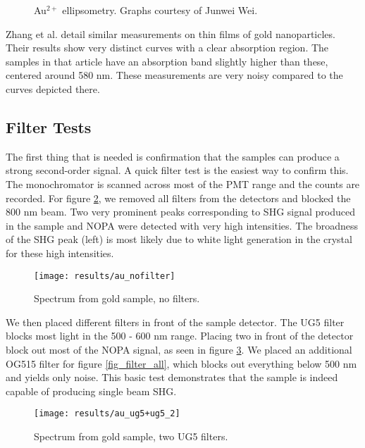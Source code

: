 \begin{figure}[h]
  \centering
  \caption[Au$^{2+}$ ellipsometry.]{Au$^{2+}$ ellipsometry. Graphs courtesy of Junwei Wei.\label{fig_au2+_ellip}}
\end{figure}

Zhang et al. \cite{zhang2003spectroscopic} detail similar measurements on thin films of gold nanoparticles. Their results show very distinct curves with a clear absorption region. The samples in that article have an absorption band slightly higher than these, centered around 580 nm. These measurements are very noisy compared to the curves depicted there.

\subsection{Filter Tests}
The first thing that is needed is confirmation that the samples can produce a strong second-order signal. A quick filter test is the easiest way to confirm this. The monochromator is scanned across most of the PMT range and the counts are recorded. For figure \ref{fig_filter_no}, we removed all filters from the detectors and blocked the 800 nm beam. Two very prominent peaks corresponding to SHG signal produced in the sample and NOPA were detected with very high intensities. The broadness of the SHG peak (left) is most likely due to white light generation in the crystal for these high intensities.

\begin{figure}[h]
\centering
\texttt{[image: results/au\_nofilter]}
\caption{Spectrum from gold sample, no filters.\label{fig_filter_no}}
\end{figure}

We then placed different filters in front of the sample detector. The UG5 filter blocks most light in the 500 - 600 nm range. Placing two in front of the detector block out most of the NOPA signal, as seen in figure \ref{fig_filter_half}. We placed an additional OG515 filter for figure \ref{fig_filter_all}, which blocks out everything below 500 nm and yields only noise. This basic test demonstrates that the sample is indeed capable of producing single beam SHG.

\begin{figure}[h]
\centering
\texttt{[image: results/au\_ug5+ug5\_2]}
\caption[Spectrum from gold sample, with filters.]{Spectrum from gold sample, two UG5 filters.\label{fig_filter_half}}
\end{figure}

